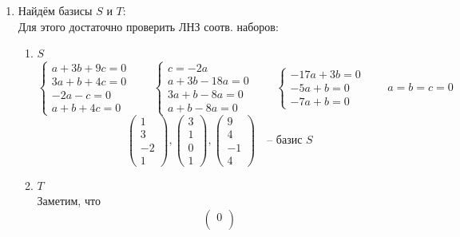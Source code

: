 \begin{enumerate}
    \item Найдём базисы $ S $ и $ T $: \\
    Для этого достаточно проверить ЛНЗ соотв. наборов:
    \begin{enumerate}
    	\item $ S $
        $$
        \begin{cases}
        	a + 3b + 9c = 0 \\
            3a + b + 4c = 0 \\
            -2a - c = 0 \\
            a + b + 4c = 0
        \end{cases} \qquad
        \begin{cases}
        	c = -2a \\
            a + 3b - 18a = 0 \\
            3a + b - 8a = 0 \\
            a + b - 8a = 0
        \end{cases} \qquad
        \begin{cases}
        	-17a + 3b = 0 \\
            -5a + b = 0 \\
            -7a + b = 0
        \end{cases} \qquad a = b = c = 0 $$
        $$
        \begin{pmatrix}
            1 \\
            3 \\
            -2 \\
            1
        \end{pmatrix},
        \begin{pmatrix}
            3 \\
            1 \\
            0 \\
            1
        \end{pmatrix},
        \begin{pmatrix}
            9 \\
            4 \\
            -1 \\
            4
        \end{pmatrix} \quad \text{-- базис } S $$
        \item $ T $ \\
        Заметим, что
        $$
        \begin{pmatrix}
        	0 \\

\end{pmatrix}$$
\end{enumerate}
\end{enumerate}
